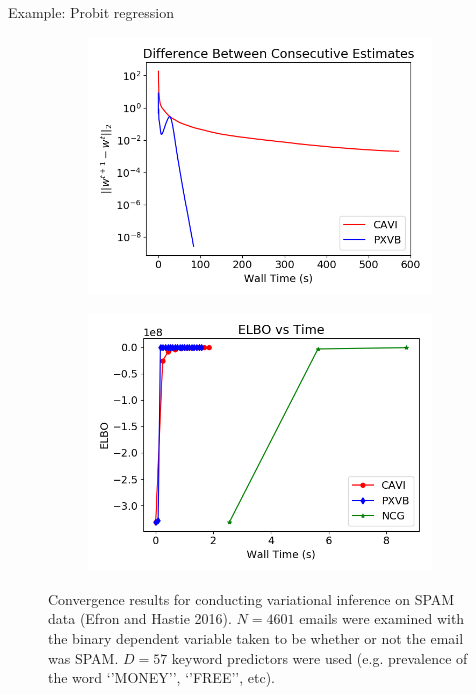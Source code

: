 \documentclass[final]{beamer}
\newlength{\twocolwid}
\begin{document}
\begin{frame}[t]
\begin{columns}[t]
\begin{column}{\twocolwid}
\begin{block}{Example: Probit regression}
\begin{figure}[h]
        \begin{subfigure}[t]{0.4\textwidth}
        \includegraphics[width=\textwidth]{Probit_real/CAVI_PX_convergence.png}
    \end{subfigure}
          \begin{subfigure}[t]{0.4\textwidth}
        \includegraphics[width=\textwidth]{Probit_real/elbo_time.png}
    \end{subfigure}
    \caption{Convergence results for conducting variational inference on SPAM data (Efron and Hastie 2016). $N= 4601$ emails were examined with the binary dependent variable taken to be whether or not the email was SPAM. $D=57$ keyword predictors were used (e.g. prevalence of the word `'MONEY'', `'FREE'', etc). }
\end{figure}


\end{block}
\end{column}
\end{columns}
\end{frame}
\end{document}
